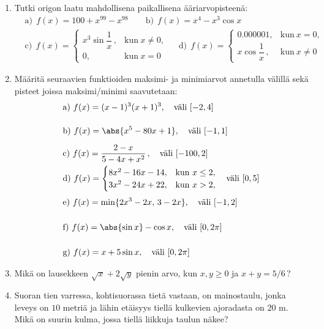 \Harj
\begin{enumerate}

\item
Tutki origon laatu mahdollisena paikallisena ääriarvopisteenä:
\begin{align*}
&\text{a)}\ \ f(x)=100+x^{99}-x^{98} \qquad
 \text{b)}\ \ f(x)=x^4-x^3\cos x \\
&\text{c)}\ \ f(x)=\begin{cases}
                  x^3\sin\dfrac{1}{x}\,, &\text{kun}\ x \neq 0, \\[2mm]
                  0,                     &\text{kun}\ x=0
                  \end{cases} \quad\
 \text{d)}\ \ f(x)=\begin{cases} 0.000001, &\text{kun}\ x=0, \\[2mm]
                  x\cos\dfrac{1}{x}\,,    &\text{kun}\ x \neq 0
                  \end{cases}
\end{align*}

\item
Määritä seuraavien funktioiden maksimi- ja minimiarvot annetulla välillä sekä pisteet
joissa maksimi/minimi saavutetaan:
\begin{align*}
&\text{a)}\ f(x)=(x-1)^3(x+1)^3, \quad \text{väli}\ [-2,4] \\[4mm]
&\text{b)}\ f(x)=\abs{x^5-80x+1}, \quad \text{väli}\ [-1,1] \\[2mm]
&\text{c)}\ f(x)=\frac{2-x}{5-4x+x^2}\,,\quad \text{väli}\ [-100,2] \\
&\text{d)}\ f(x)=\begin{cases}
                 8x^2-16x-14, &\text{kun}\ x \le 2, \\ 3x^2-24x+22, &\text{kun}\ x>2,
                 \end{cases} \quad \text{väli}\ [0,5] \\[1mm]
&\text{e)}\ f(x)=\min\{2x^3-2x,\,3-2x\}, \quad \text{väli}\ [-1,2] \\[5mm]
&\text{f)}\ f(x)=\abs{\sin x}-\cos x, \quad \text{väli}\ [0,2\pi] \\[5mm]
&\text{g)}\ f(x)=x+5\sin x, \quad \text{väli}\ [0,2\pi]
\end{align*}

\item
Mikä on lausekkeen $\sqrt{x}+2\sqrt{y}$ pienin arvo, kun $x,y \ge 0$ ja $x+y=5/6$\,?

\item
Suoran tien varressa, kohtisuorassa tietä vastaan, on mainostaulu, jonka leveys on $10$ metriä
ja lähin etäisyys tiellä kulkevien ajoradasta on $20$ m. Mikä on suurin kulma, jossa tiellä
liikkuja taulun näkee?


\end{enumerate}
